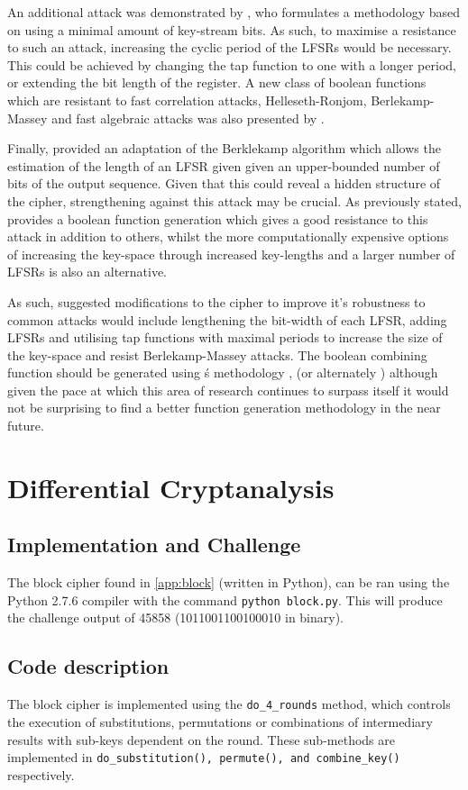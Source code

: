 \documentclass[british,11pt,a4paper]{article}
\begin{document}
An additional attack was demonstrated by \citet{helleseth}, who formulates a methodology based on using a minimal amount of key-stream bits. As such, to maximise a resistance to such an attack, increasing the cyclic period of the LFSRs would be necessary. This could be achieved by changing the tap function to one with a longer period, or extending the bit length of the register. A new class of boolean functions which are resistant to fast correlation attacks, Helleseth-Ronjom, Berlekamp-Massey and fast algebraic attacks was also presented by \citet{carlet2}.

Finally, \citet{massey} provided an adaptation of the Berklekamp algorithm which allows the estimation of the length of an LFSR given \citet{massey} given an upper-bounded number of bits of the output sequence. Given that this could reveal a hidden structure of the cipher, strengthening against this attack may be crucial. As previously stated, \citeauthor{carlet2} provides a boolean function generation which gives a good resistance to this attack in addition to others, whilst the more computationally expensive options of increasing the key-space through increased key-lengths and a larger number of LFSRs is also an alternative.

As such, suggested modifications to the cipher to improve it's robustness to common attacks would include lengthening the bit-width of each LFSR, adding LFSRs and utilising tap functions with maximal periods to increase the size of the key-space and resist Berlekamp-Massey attacks. The boolean combining function should be generated using \citeauthor{carlet2}\'s methodology \cite{carlet2}, (or alternately \citet{tang}) although given the pace at which this area of research continues to surpass itself it would not be surprising to find a better function generation methodology in the near future.

\clearpage
\section{Differential Cryptanalysis}
\subsection{Implementation and Challenge}
The block cipher found in \autoref{app:block} (written in Python),{}
can be ran using the Python 2.7.6 compiler with the command \lstinline{python block.py}. This will produce the
challenge output of 45858 (1011001100100010 in binary).
\subsection{Code description}
The block cipher is implemented using the \lstinline{do_4_rounds} method, which controls the execution of substitutions, permutations or combinations
of intermediary results with sub-keys dependent on the round. These sub-methods are implemented in \lstinline{do_substitution(), permute(), and combine_key()} respectively.
\end{document}
